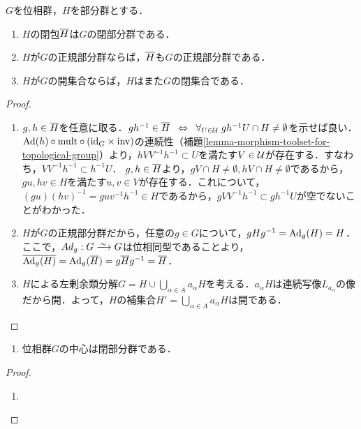 \documentclass[uplatex,dvipdfmx]{jsreport}
\begin{document}
\begin{lemma}
    $G$を位相群，$H$を部分群とする．
    \begin{enumerate}
        \item $H$の閉包$\overline{H}$は$G$の閉部分群である．
        \item $H$が$G$の正規部分群ならば，$\overline{H}$も$G$の正規部分群である．
        \item $H$が$G$の開集合ならば，$H$はまた$G$の閉集合である．
    \end{enumerate}
\end{lemma}
\begin{proof}\mbox{}
    \begin{enumerate}
        \item $g,h\in\overline{H}$を任意に取る．$gh^{-1}\in\overline{H}\;\;\Leftrightarrow\;\;\forall_{U\in\mathcal{U}}\;gh^{-1}U\cap H\ne\emptyset$を示せば良い．
        $\mathrm{Ad}(h)\circ\mathrm{mult}\circ(\mathrm{id}_G\times\mathrm{inv})$の連続性（補題\ref{lemma-morphism-toolset-for-topological-group}）より，$hVV^{-1}h^{-1}\subset U$を満たす$V\in\mathcal{U}$が存在する．すなわち，$VV^{-1}h^{-1}\subset h^{-1}U$．
        $g,h\in\overline{H}$より，$gV\cap H\ne\emptyset,hV\cap H\ne\emptyset$であるから，$gu,hv\in H$を満たす$u,v\in V$が存在する．これについて，$(gu)(hv)^{-1}=guv^{-1}h^{-1}\in H$であるから，$gVV^{-1}h^{-1}\subset gh^{-1}U$が空でないことがわかった．
        \item 
        $H$が$G$の正規部分群だから，任意の$g\in G$について，$gHg^{-1}=\mathrm{Ad}_g(H)=H$．ここで，$Ad_g:G\iso G$は位相同型であることより，$\overline{\mathrm{Ad}_g(H)}=\mathrm{Ad}_g(\overline{H})=g\overline{H}g^{-1}=\overline{H}$．
        \item $H$による左剰余類分解$G=H\cup\bigcup_{\alpha\in A}a_\alpha H$を考える．$a_\alpha H$は連続写像$L_{a_\alpha}$の像だから開．よって，$H$の補集合$H'=\bigcup_{\alpha\in A}a_{\alpha}H$は開である．
    \end{enumerate}
\end{proof}

\begin{lemma}\mbox{}
    \begin{enumerate}
        \item 位相群$G$の中心は閉部分群である．
    \end{enumerate}
\end{lemma}
\begin{proof}\mbox{}
    \begin{enumerate}
        \item 
    \end{enumerate}
\end{proof}
\end{document}
